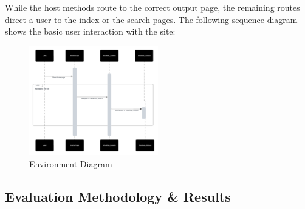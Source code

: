 	While the host methods route to the correct output page, the remaining routes direct a user to the index or the search pages. The following sequence diagram shows the basic user interaction with the site:
\begin{figure}[htbp]
    \centering
    \includegraphics[width=0.5\textwidth]{sequenceD.png}
    \caption{Environment Diagram}
    \label{fig:example}
\end{figure}

\subsection{Evaluation Methodology \& Results}

	
